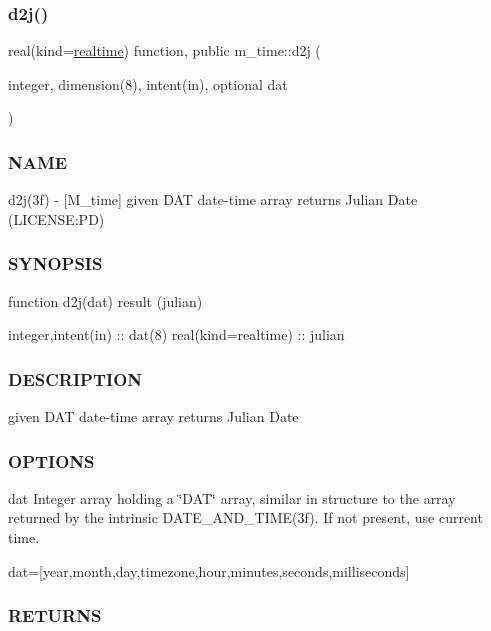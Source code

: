 \subsubsection{\texorpdfstring{d2j()}{d2j()}}
{\footnotesize\ttfamily real(kind=\mbox{\hyperlink{namespacem__time_ac10ea9e8d59ec74eaa7d89f2517d7422}{realtime}}) function, public m\+\_\+time\+::d2j (\begin{DoxyParamCaption}\item[{integer, dimension(8), intent(in), optional}]{dat }\end{DoxyParamCaption})}



\subsubsection*{N\+A\+ME}

d2j(3f) -\/ \mbox{[}M\+\_\+time\mbox{]} given D\+AT date-\/time array returns Julian Date (L\+I\+C\+E\+N\+SE\+:PD) 

\subsubsection*{S\+Y\+N\+O\+P\+S\+IS}

\begin{DoxyVerb}function d2j(dat) result (julian)

 integer,intent(in)  :: dat(8)
 real(kind=realtime) :: julian
\end{DoxyVerb}


\subsubsection*{D\+E\+S\+C\+R\+I\+P\+T\+I\+ON}

given D\+AT date-\/time array returns Julian Date

\subsubsection*{O\+P\+T\+I\+O\+NS}

dat Integer array holding a \char`\"{}\+D\+A\+T\char`\"{} array, similar in structure to the array returned by the intrinsic D\+A\+T\+E\+\_\+\+A\+N\+D\+\_\+\+T\+I\+M\+E(3f). If not present, use current time.

dat=\mbox{[}year,month,day,timezone,hour,minutes,seconds,milliseconds\mbox{]} \subsubsection*{R\+E\+T\+U\+R\+NS}

